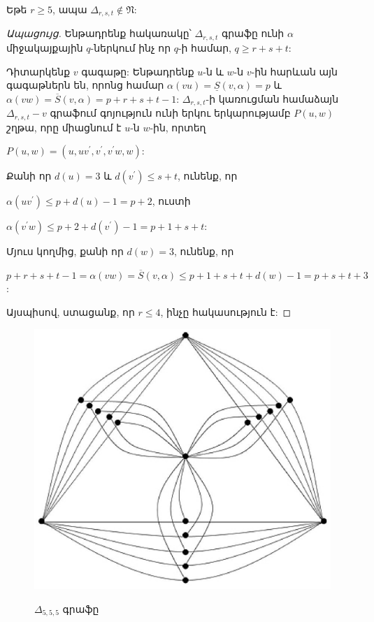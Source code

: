 \begin{theorem}
\label{t3_Shannon} Եթե $r\geq 5$, ապա $\Delta_{r,s,t}\notin
\mathfrak{N}$:
\end{theorem}
\begin{proof}[Ապացույց]
Ենթադրենք հակառակը՝ $\Delta_{r,s,t}$ գրաֆը ունի  $\alpha$ միջակայքային $q$-ներկում ինչ որ $q$-ի համար, $q\geq r+s+t$:

Դիտարկենք $v$ գագաթը: Ենթադրենք $u$-ն և $w$-ն $v$-ին հարևան այն գագաթներն են, որոնց համար $\alpha(vu)=\underline{S}(v,\alpha)=p$ և
$\alpha(vw)=\overline{S}(v,\alpha)=p+r+s+t-1$: 
$\Delta_{r,s,t}$-ի կառուցման համաձայն $\Delta_{r,s,t}-v$ գրաֆում գոյություն ունի երկու երկարությամբ $P(u,w)$ շղթա, որը միացնում է $u$-ն  $w$-ին, որտեղ
\begin{center}
$P(u,w)=(u,uv^{\prime},v^{\prime},v^{\prime}w,w)$:
\end{center}

Քանի որ $d(u)=3$ և $d(v^{\prime})\leq s+t$, ունենք, որ

\begin{center}
$\alpha(uv^{\prime})\leq p+d(u)-1=p+2$, ուստի
\end{center}
\begin{center}
$\alpha(v^{\prime}w)\leq p+2+ d(v^{\prime})-1=p+1+s+t$:
\end{center}

Մյուս կողմից, քանի որ $d(w)=3$, ունենք, որ

\begin{center}
$p+r+s+t-1=\alpha(vw)=\overline{S}(v,\alpha)\leq p+1+s+t+d(w)-1=p+s+t+3$:
\end{center}
Այսպիսով, ստացանք, որ $r\leq 4$, ինչը հակասություն է:
\end{proof}

\begin{figure}[h]
\begin{center}
\includegraphics[width=30pc]{figures/shannon555.eps}\\
\caption{$\Delta_{5,5,5}$ գրաֆը}\label{f3_Shannon555}
\end{center}
\end{figure}


